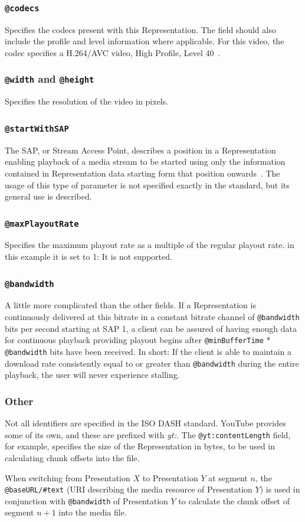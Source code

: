 \subsubsection{\texttt{@codecs}}
Specifies the codecs present with this
Representation. The field should also include the profile and level
information where applicable. For this video, the codec specifies a
H.264/AVC video, High Profile, Level 40~\cite[p. 12]{rfc6381}.

\subsubsection{\texttt{@width} and \texttt{@height}}
Specifies the resolution of the video in pixels.

\subsubsection{\texttt{@startWithSAP}}
The SAP, or Stream Access Point, describes a position in a Representation
enabling playback of a media stream to be started using only the information
contained in Representation data starting form that position
onwards~\cite[p. 11]{iso-dash-2014}. The usage of this type of parameter
is not specified exactly in the standard, but its general use is described.

\subsubsection{\texttt{@maxPlayoutRate}}
Specifies the maximum playout rate as a multiple of the
regular playout rate. in this example it is set to 1: It is not supported.

\subsubsection{\texttt{@bandwidth}}
A little more complicated than the other fields.
If a Representation is continuously delivered at this bitrate in a
constant bitrate channel of \texttt{@bandwidth} bits per second starting at
SAP 1, a client
can be assured of having enough data for continuous playback providing
playout begins after \texttt{@minBufferTime} * \texttt{@bandwidth} bits have been
received. In short: If the client is able to maintain a download rate
consistently equal to or greater than \texttt{@bandwidth} during the entire
playback, the user will never experience stalling.

\subsubsection{Other}
Not all identifiers are specified in the ISO DASH standard. YouTube
provides some of its own, and these are prefixed with \textit{yt:}.
The \texttt{@yt:contentLength} field, for example, specifies the size of the
Representation in bytes, to be used in calculating chunk offsets into the file.

When switching from Presentation $X$ to Presentation $Y$ at segment $n$, the
\texttt{@baseURL/#text} (URI describing the media resource of Presentation $Y$)
is used in conjunction with \texttt{@bandwidth} of Presentation $Y$ to
calculate the chunk offset of segment $n+1$ into the media file.

